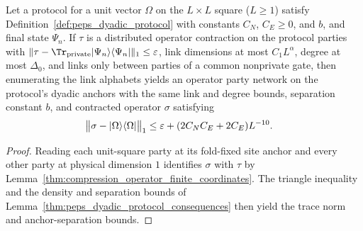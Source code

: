 \begin{lemma}
    \label{lem:peps_protocol_compressed_party_network}
    \leanok
    Let a protocol for a unit vector $\Omega$ on the $L\times L$ square
    ($L\ge1$) satisfy Definition~\ref{def:peps_dyadic_protocol} with constants
    $C_N$, $C_E\ge0$, and $b$, and final state $\Psi_n$. If $\tau$ is a
    distributed operator contraction on the protocol parties with
    $\lVert\tau-\Tr_{\rm private}|\Psi_n\rangle\langle\Psi_n|\rVert_1\le\varepsilon$,
    link dimensions at most $C_1L^\alpha$, degree at most $\Delta_0$, and links
    only between parties of a common nonprivate gate, then enumerating the link
    alphabets yields an operator party network on the protocol's dyadic anchors
    with the same link and degree bounds, separation constant $b$, and
    contracted operator $\sigma$ satisfying
    \begin{align}
        \bigl\lVert\sigma-|\Omega\rangle\langle\Omega|\bigr\rVert_1
         & \le\varepsilon+(2C_NC_E+2C_E)L^{-10}. \notag
    \end{align}
\end{lemma}
\begin{proof}
    \leanok
    Reading each unit-square party at its fold-fixed site anchor and every
    other party at physical dimension $1$ identifies $\sigma$ with $\tau$ by
    Lemma~\ref{thm:compression_operator_finite_coordinates}. The triangle
    inequality and the density and separation bounds of
    Lemma~\ref{thm:peps_dyadic_protocol_consequences} then yield the trace
    norm and anchor-separation bounds.
\end{proof}

